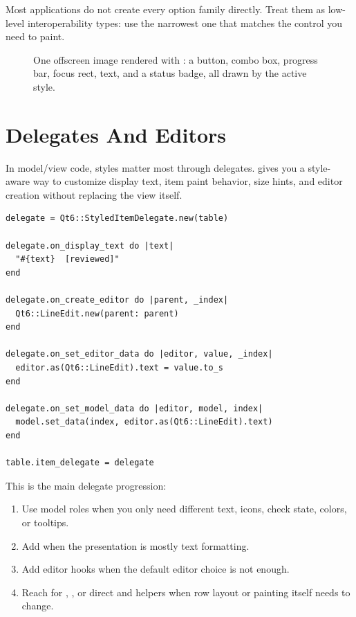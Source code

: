 Most applications do not create every option family directly. Treat them as low-level interoperability types: use the narrowest one that matches the control you need to paint.

\begin{figure}[htbp]
  \centering
  \caption{One offscreen image rendered with : a button, combo box, progress bar, focus rect, text, and a status badge, all drawn by the active style.}
\end{figure}

\section{Delegates And Editors}

In model/view code, styles matter most through delegates.  gives you a style-aware way to customize display text, item paint behavior, size hints, and editor creation without replacing the view itself.

\begin{lstlisting}[style=crystal]
delegate = Qt6::StyledItemDelegate.new(table)

delegate.on_display_text do |text|
  "#{text}  [reviewed]"
end

delegate.on_create_editor do |parent, _index|
  Qt6::LineEdit.new(parent: parent)
end

delegate.on_set_editor_data do |editor, value, _index|
  editor.as(Qt6::LineEdit).text = value.to_s
end

delegate.on_set_model_data do |editor, model, index|
  model.set_data(index, editor.as(Qt6::LineEdit).text)
end

table.item_delegate = delegate
\end{lstlisting}

This is the main delegate progression:

\begin{enumerate}
  \item Use model roles when you only need different text, icons, check state, colors, or tooltips.
  \item Add  when the presentation is mostly text formatting.
  \item Add editor hooks when the default editor choice is not enough.
  \item Reach for , , or direct  and  helpers when row layout or painting itself needs to change.
\end{enumerate}

